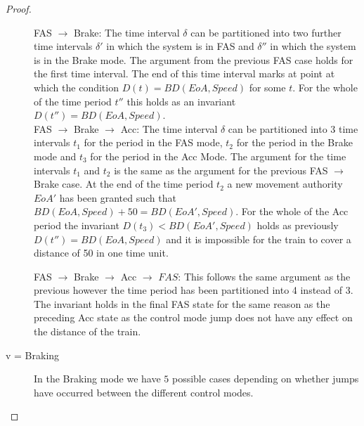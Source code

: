 \begin{mytheorem}
\begin{proof}
\begin{description}
FAS $\to$ Brake: The time interval $\delta$ can be partitioned into two further time intervals $\delta'$ in which the system is in FAS and $\delta''$ in which the system is in the Brake mode. The argument from the previous FAS case holds for the first time interval. The end of this time interval marks at point at which the condition $D(t) = BD(EoA, Speed)$ for some $t$. For the whole of the time period $t''$ this holds as an invariant $D(t'') = BD(EoA,Speed)$. \\

FAS $\to$ Brake $\to$ Acc: The time interval $\delta$ can be partitioned into 3 time intervals $t_1$ for the period in the FAS mode, $t_2$ for the period in the Brake mode and $t_3$ for the period in the Acc Mode. The argument for the time intervals $t_1$ and $t_2$ is the same as the argument for the previous FAS $\to$ Brake case. At the end of the time period $t_2$ a new movement authority $EoA'$ has been granted such that $ BD(EoA,Speed) + 50 =  BD(EoA', Speed)$.  For the whole of the Acc period the invariant $D(t_3) < BD(EoA',Speed)$ holds as previously $D(t'') = BD(EoA,Speed)$ and it is impossible for the train to cover a distance of 50 in one time unit.


FAS $\to$ Brake $\to$ Acc $\to$ $FAS$: This follows the same argument as the previous however the time period has been partitioned into 4 instead of 3. The invariant holds in the final FAS state for the same reason as the preceding Acc state as the control mode jump does not have any effect on the distance of the train.

\item[v = Braking]
In the Braking mode we have $5$ possible cases depending on whether jumps have occurred between the different control modes.

\end{description}
\end{proof}
\end{mytheorem}
